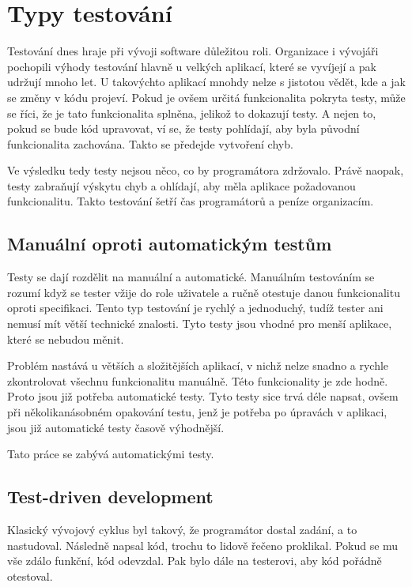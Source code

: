 \documentclass[czech,master,public,dept460,male,cpdeclaration,twoside]{diploma}
\begin{document}
\section{Typy testování}

Testování dnes hraje při vývoji software důležitou roli. Organizace i vývojáři pochopili výhody testování hlavně u velkých aplikací, které se vyvíjejí a pak udržují mnoho let. U takovýchto aplikací mnohdy nelze s jistotou vědět, kde a jak se změny v kódu projeví. Pokud je ovšem určitá funkcionalita pokryta testy, může se říci, že je tato funkcionalita splněna, jelikož to dokazují testy. A nejen to, pokud se bude kód upravovat, ví se, že testy pohlídají, aby byla původní funkcionalita zachována. Takto se předejde vytvoření chyb.

Ve výsledku tedy testy nejsou něco, co by programátora zdržovalo. Právě naopak, testy zabraňují výskytu chyb a ohlídají, aby měla aplikace požadovanou funkcionalitu. Takto testování šetří čas programátorů a peníze organizacím. \cite{testingANG}

\subsection{Manuální oproti automatickým testům}
Testy se dají rozdělit na manuální a automatické. Manuálním testováním se rozumí když se tester vžije do role uživatele a ručně otestuje danou funkcionalitu oproti specifikaci. Tento typ testování je rychlý a jednoduchý, tudíž tester ani nemusí mít větší technické znalosti. Tyto testy jsou vhodné pro menší aplikace, které se nebudou měnit.

Problém nastává u větších a složitějších aplikací, v nichž nelze snadno a rychle zkontrolovat všechnu funkcionalitu manuálně. Této funkcionality je zde hodně. Proto jsou již potřeba automatické testy. Tyto testy sice trvá déle napsat, ovšem při několikanásobném opakování testu, jenž je potřeba po úpravách v aplikaci, jsou již automatické testy časově výhodnější.

Tato práce se zabývá automatickými testy. \cite{manual}

\subsection{Test-driven development}
Klasický vývojový cyklus byl takový, že programátor dostal zadání, a to nastudoval. Následně napsal kód, trochu to lidově řečeno proklikal. Pokud se mu vše zdálo funkční, kód odevzdal. Pak bylo dále na testerovi, aby kód pořádně otestoval.
\end{document}
